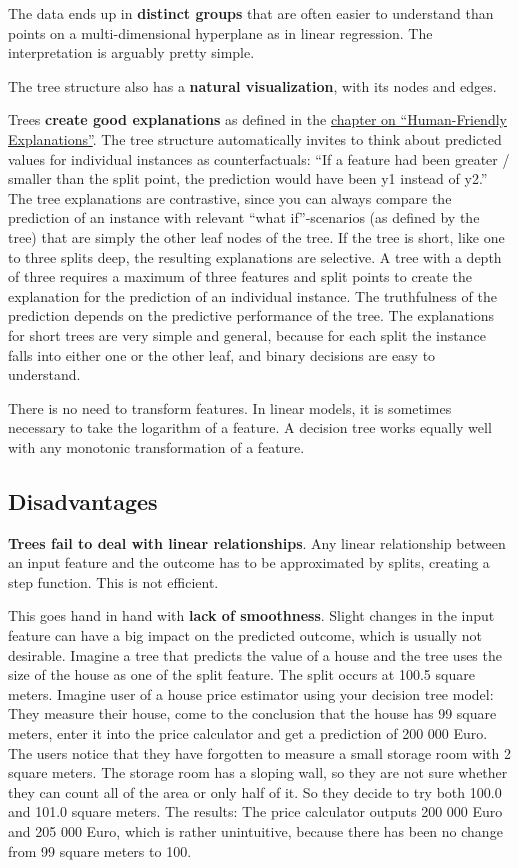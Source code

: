 \documentclass[
  11pt,
]{scrbook}
\begin{document}
The data ends up in \textbf{distinct groups} that are often easier to understand than points on a multi-dimensional hyperplane as in linear regression.
The interpretation is arguably pretty simple.

The tree structure also has a \textbf{natural visualization}, with its nodes and edges.

Trees \textbf{create good explanations} as defined in the \protect\hyperlink{good-explanation}{chapter on ``Human-Friendly Explanations''}.
The tree structure automatically invites to think about predicted values for individual instances as counterfactuals:
``If a feature had been greater / smaller than the split point, the prediction would have been y1 instead of y2.''
The tree explanations are contrastive, since you can always compare the prediction of an instance with relevant ``what if''-scenarios (as defined by the tree) that are simply the other leaf nodes of the tree.
If the tree is short, like one to three splits deep, the resulting explanations are selective.
A tree with a depth of three requires a maximum of three features and split points to create the explanation for the prediction of an individual instance.
The truthfulness of the prediction depends on the predictive performance of the tree.
The explanations for short trees are very simple and general, because for each split the instance falls into either one or the other leaf, and binary decisions are easy to understand.

There is no need to transform features.
In linear models, it is sometimes necessary to take the logarithm of a feature.
A decision tree works equally well with any monotonic transformation of a feature.

\hypertarget{disadvantages-2}{%
\subsection{Disadvantages}\label{disadvantages-2}}

\textbf{Trees fail to deal with linear relationships}.
Any linear relationship between an input feature and the outcome has to be approximated by splits, creating a step function.
This is not efficient.

This goes hand in hand with \textbf{lack of smoothness}.
Slight changes in the input feature can have a big impact on the predicted outcome, which is usually not desirable.
Imagine a tree that predicts the value of a house and the tree uses the size of the house as one of the split feature.
The split occurs at 100.5 square meters.
Imagine user of a house price estimator using your decision tree model:
They measure their house, come to the conclusion that the house has 99 square meters, enter it into the price calculator and get a prediction of 200 000 Euro.
The users notice that they have forgotten to measure a small storage room with 2 square meters.
The storage room has a sloping wall, so they are not sure whether they can count all of the area or only half of it.
So they decide to try both 100.0 and 101.0 square meters.
The results: The price calculator outputs 200 000 Euro and 205 000 Euro, which is rather unintuitive, because there has been no change from 99 square meters to 100.
\end{document}
